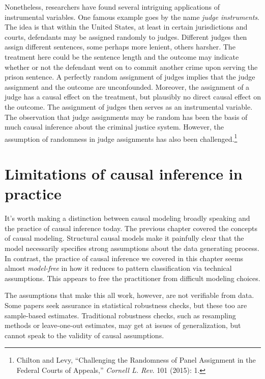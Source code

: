 \documentclass{tufte-book}
\begin{document}
Nonetheless, researchers have found several intriguing applications of
instrumental variables. One famous example goes by the name \emph{judge
instruments}. The idea is that within the United States, at least in
certain jurisdictions and courts, defendants may be assigned randomly to
judges. Different judges then assign different sentences, some perhaps
more lenient, others harsher. The treatment here could be the sentence
length and the outcome may indicate whether or not the defendant went on
to commit another crime upon serving the prison sentence. A perfectly
random assignment of judges implies that the judge assignment and the
outcome are unconfounded. Moreover, the assignment of a judge has a
causal effect on the treatment, but plausibly no direct causal effect on
the outcome. The assignment of judges then serves as an instrumental
variable. The observation that judge assignments may be random has been
the basis of much causal inference about the criminal justice system.
However, the assumption of randomness in judge assignments has also been
challenged.\footnote{Chilton and Levy, {``Challenging the Randomness of
  Panel Assignment in the Federal Courts of Appeals,''} \emph{Cornell L.
  Rev.} 101 (2015): 1.}

\hypertarget{limitations-of-causal-inference-in-practice}{%
\section{Limitations of causal inference in
practice}\label{limitations-of-causal-inference-in-practice}}

It's worth making a distinction between causal modeling broadly speaking
and the practice of causal inference today. The previous chapter covered
the concepts of causal modeling. Structural causal models make it
painfully clear that the model necessarily specifies strong assumptions
about the data generating process. In contrast, the practice of causal
inference we covered in this chapter seems almost \emph{model-free} in
how it reduces to pattern classification via technical assumptions. This
appears to free the practitioner from difficult modeling choices.

The assumptions that make this all work, however, are not verifiable
from data. Some papers seek assurance in statistical robustness checks,
but these too are sample-based estimates. Traditional robustness checks,
such as resampling methods or leave-one-out estimates, may get at issues
of generalization, but cannot speak to the validity of causal
assumptions.
\end{document}
